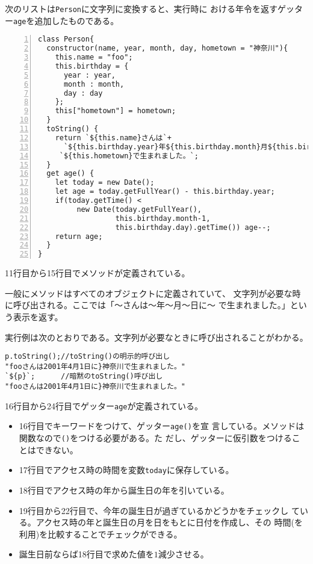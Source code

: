 \begin{Exec}\upshape\label{PersonWidthGetter}
次のリストは\texttt{Person}に文字列に変換すると、実行時に
 おける年令を返すゲッター\texttt{age}を追加したものである。
\begin{Verbatim}[numbers=left]
class Person{
  constructor(name, year, month, day, hometown = "神奈川"){
    this.name = "foo";
    this.birthday = {
      year : year,
      month : month,
      day : day
    };
    this["hometown"] = hometown;
  }
  toString() {
    return `${this.name}さんは`+
      `${this.birthday.year}年${this.birthday.month}月${this.birthday.day}日に` +
     `${this.hometown}で生まれました。`;
  }
  get age() {
    let today = new Date();
    let age = today.getFullYear() - this.birthday.year;
    if(today.getTime() <
         new Date(today.getFullYear(),
                  this.birthday.month-1,
                  this.birthday.day).getTime()) age--;
    return age;
  }
}
\end{Verbatim}
 11行目から15行目でメソッドが定義されている。

 一般にメソッドはすべてのオブジェクトに定義されていて、
 文字列が必要な時に呼び出される。ここでは「～さんは～年～月～日に～
        で生まれました。」という表示を返す。

実行例は次のとおりである。文字列が必要なときに呼び出されることがわかる。
\begin{Verbatim}
p.toString();//toString()の明示的呼び出し
"fooさんは2001年4月1日に}神奈川で生まれました。"
`${p}`;      //暗黙のtoString()呼び出し
"fooさんは2001年4月1日に}神奈川で生まれました。"
\end{Verbatim}
 16行目から24行目でゲッター\texttt{age}が定義されている。
 \begin{itemize}
 \item 16行目でキーワードをつけて、ゲッター\texttt{age()}を宣
       言している。メソッドは関数なので\texttt{()}をつける必要がある。た
       だし、ゲッターに仮引数をつけることはできない。
 \item 17行目でアクセス時の時間を変数\texttt{today}に保存している。
 \item 18行目でアクセス時の年から誕生日の年を引いている。
 \item 19行目から22行目で、今年の誕生日が過ぎているかどうかをチェックし
       ている。アクセス時の年と誕生日の月を日をもとに日付を作成し、その
       時間(を利用)を比較することでチェックができる。
 \item 誕生日前ならば18行目で求めた値を$1$減少させる。
 \end{itemize}
\end{Exec}
